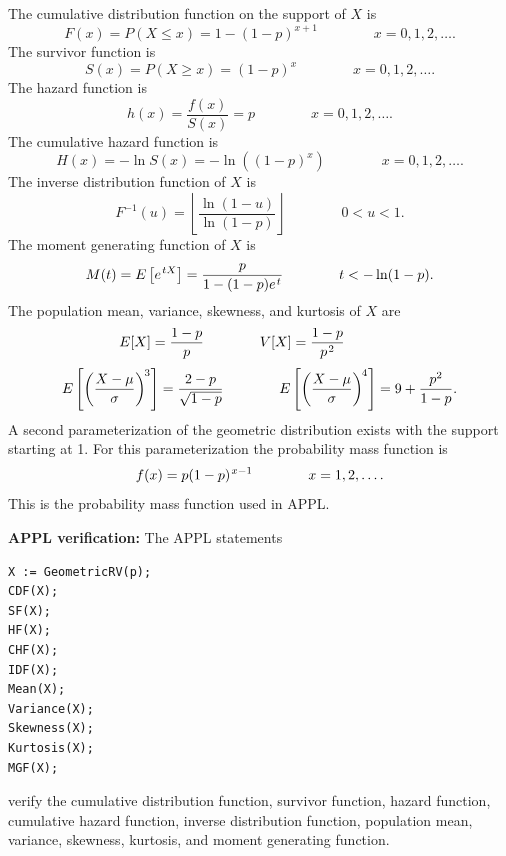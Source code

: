 \documentclass[12pt,fullpage]{article}
\begin{document}
\noindent
The cumulative distribution function on
the support of $X$ is
$$
F(x) = P(X \le x) = 1 - (1 - p) ^ {x + 1}  \qquad \qquad x=0,1,2,\ldots.
$$
The survivor function is
$$
S(x) = P(X \ge x) = (1 - p) ^ {x} \qquad \qquad x=0,1,2,\ldots.
$$
The hazard function is
$$
h(x) = \frac{f(x)} {S(x)} = p \qquad \qquad x=0,1,2,\ldots.
$$
The cumulative hazard function  is
$$
H(x) = - \ln S(x) = -\ln((1 - p) ^ {x})  \qquad \qquad x=0,1,2,\ldots.
$$
The inverse distribution function of $X$ is
$$
F ^ {-1}(u) = \left \lfloor {\frac {\ln  \left( 1 - u \right) } {\ln  \left( 1 - p \right) }} \right \rfloor \qquad \qquad 0 < u < 1.
$$
The moment generating function of $X$ is
$$
M(t) = E \left[ e ^ {\kern 0.08 em tX} \right] = \frac {p}{1 - (1 - p) e ^ {\kern 0.08 em t}}  \qquad \qquad t < -\ln(1 - p).
$$
The population mean, variance, skewness, and kurtosis of $X$ are
$$
E[X] = \frac{1 - p} {p} \qquad \qquad 
V[X] = \frac{1 - p} {p ^ {\kern 0.08 em 2}} \qquad \qquad 
$$
$$
E\left[ \left( \frac{X - \mu} {\sigma} \right) ^ {\kern -0.08 em 3} \right] = \frac{2 - p} {\sqrt{ 1 - p}}\qquad \qquad 
E\left[ \left( \frac{X - \mu} {\sigma} \right) ^ {\kern -0.08 em 4} \right] = 9 + \frac{p^2}{1-p}.
$$
A second parameterization of the geometric distribution exists with the support starting 
at 1. For this parameterization the probability mass function is
$$
f(x) = p(1 - p) ^ {\kern 0.08 em x - 1} \qquad \qquad x=1,2,\ldots.
$$
This is the probability mass function used in APPL.
\vspace{0.1in}

\noindent
{\bf APPL verification:}
The APPL statements
\begin{verbatim}
X := GeometricRV(p);
CDF(X);
SF(X);
HF(X);
CHF(X);
IDF(X);
Mean(X);
Variance(X);
Skewness(X);
Kurtosis(X);
MGF(X);
\end{verbatim}
verify the cumulative distribution function, survivor function, hazard function, cumulative hazard function, inverse distribution function, population mean, variance, skewness, kurtosis, and moment generating function.
\end{document}
